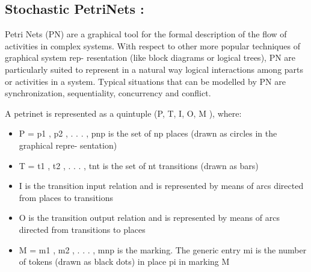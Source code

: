 \documentclass[a4paper,12pt]{article}
\begin{document}
\subsection{Stochastic  PetriNets :}

Petri Nets (PN) are a graphical tool for the formal description of the flow of activities in
complex systems. With respect to other more popular techniques of graphical system rep-
resentation (like block diagrams or logical trees), PN are particularly suited to represent in
a natural way logical interactions among parts or activities in a system. Typical situations
that can be modelled by PN are synchronization, sequentiality, concurrency and conflict.

A petrinet is represented as a quintuple (P, T, I, O, M ), where: \\
\begin{itemize}
  \item  P = {p1 , p2 , . . . , pnp } is the set of np places (drawn as circles in the graphical repre-
sentation)
  \item T = {t1 , t2 , . . . , tnt } is the set of nt transitions (drawn as bars)
  \item I is the transition input relation and is represented by means of arcs directed from
places to transitions
  \item O is the transition output relation and is represented by means of arcs directed from
transitions to places
  \item M = {m1 , m2 , . . . , mnp } is the marking. The generic entry mi is the number of
tokens (drawn as black dots) in place pi in marking M 
\end{itemize}
 \newpage
\end{document}
